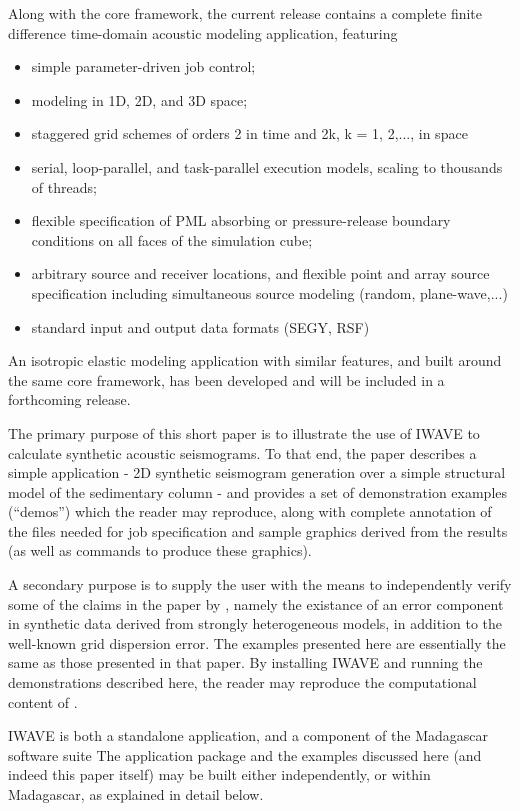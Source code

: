 Along with the core framework, the current release
contains a complete finite difference time-domain acoustic modeling 
application, featuring
\begin{itemize}
\item simple parameter-driven job control;
\item modeling in 1D, 2D, and 3D space;
\item staggered grid schemes of orders 2 in time and 2k, k = 1, 2,..., in space
\item serial, loop-parallel, and task-parallel execution models,
  scaling to thousands of threads; 
\item flexible specification of PML absorbing or pressure-release
  boundary conditions on all faces of the simulation cube;
\item arbitrary source and receiver locations, and flexible point and array
  source specification including simultaneous source modeling (random,
  plane-wave,...)
\item standard input and output data formats (SEGY, RSF)
\end{itemize}
An isotropic elastic modeling application with similar features, and
built around the same core framework, has
been developed and will be included in a forthcoming release.

The primary purpose of this short paper is to illustrate the use of
IWAVE to calculate synthetic acoustic seismograms. To that end, the paper
describes a simple application - 2D synthetic seismogram generation
over a simple structural model of the sedimentary column - and
provides a set of demonstration examples (``demos'') which the reader
may reproduce, along with complete annotation of the files needed for
job specification and sample graphics derived from the results (as
well as commands to produce these graphics).

A secondary purpose is to supply the user with the means to
independently verify some of the claims in the paper by
\cite{SymesVdovina:09}, namely the existance of an error component in
synthetic data derived from strongly heterogeneous models, in addition
to the well-known grid dispersion error. The examples presented here
are essentially the same as those presented in that paper. By
installing IWAVE and running the demonstrations described here, the
reader may reproduce the computational content of \cite[]{SymesVdovina:09}.

IWAVE is both a standalone application, and a component of the
Madagascar software suite \cite[]{Madagascar}
The application package and the examples discussed
here (and indeed this paper itself) may be built either independently, or within Madagascar, as
explained in detail below.

